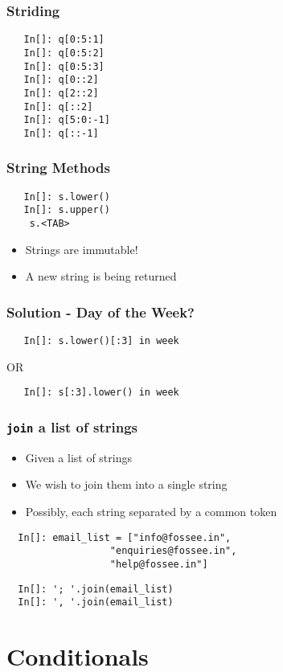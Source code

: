 \begin{frame}[fragile]
  \frametitle{Striding}
  \begin{lstlisting}
   In[]: q[0:5:1]
   In[]: q[0:5:2]
   In[]: q[0:5:3]
   In[]: q[0::2]
   In[]: q[2::2]
   In[]: q[::2]
   In[]: q[5:0:-1]
   In[]: q[::-1]
  \end{lstlisting}
\end{frame}

\begin{frame}[fragile]
  \frametitle{String Methods} 
  \begin{lstlisting}
   In[]: s.lower()
   In[]: s.upper()
    s.<TAB>
  \end{lstlisting}
  \begin{itemize}
  \item \alert{Strings are immutable!}
  \item A new string is being returned
  \end{itemize}
\end{frame}

\begin{frame}[fragile]
  \frametitle{Solution - Day of the Week?}
  \begin{lstlisting}
   In[]: s.lower()[:3] in week
  \end{lstlisting}
  OR
  \begin{lstlisting}
   In[]: s[:3].lower() in week
  \end{lstlisting}
\end{frame}

\begin{frame}[fragile]
  \frametitle{\texttt{join} a list of strings}
  \begin{itemize}
  \item Given a list of strings
  \item We wish to join them into a single string
  \item Possibly, each string separated by a common token
  \end{itemize}
  \begin{lstlisting}
  In[]: email_list = ["info@fossee.in", 
                  "enquiries@fossee.in",
                  "help@fossee.in"]
  \end{lstlisting}
  \begin{lstlisting}
  In[]: '; '.join(email_list)
  In[]: ', '.join(email_list)
  \end{lstlisting}
\end{frame}

\section{Conditionals}

